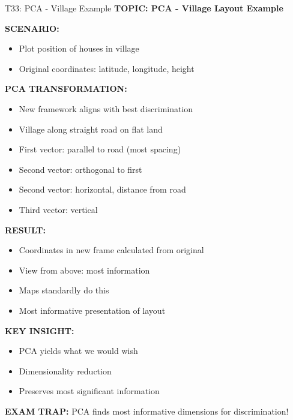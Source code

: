 \documentclass[8pt]{beamer}
\begin{document}
	\begin{frame}{T33: PCA - Village Example}
		\fontsize{6.5}{7.5}\selectfont
		\textbf{TOPIC: PCA - Village Layout Example}
		
		\vspace{0.1cm}
		\textbf{SCENARIO:}
		\begin{itemize}
			\item Plot position of houses in village
			\item Original coordinates: latitude, longitude, height
		\end{itemize}
		
		\vspace{0.1cm}
		\textbf{PCA TRANSFORMATION:}
		\begin{itemize}
			\item New framework aligns with best discrimination
			\item Village along straight road on flat land
			\item First vector: parallel to road (most spacing)
			\item Second vector: orthogonal to first
			\item Second vector: horizontal, distance from road
			\item Third vector: vertical
		\end{itemize}
		
		\vspace{0.1cm}
		\textbf{RESULT:}
		\begin{itemize}
			\item Coordinates in new frame calculated from original
			\item View from above: most information
			\item Maps standardly do this
			\item Most informative presentation of layout
		\end{itemize}
		
		\vspace{0.1cm}
		\textbf{KEY INSIGHT:}
		\begin{itemize}
			\item PCA yields what we would wish
			\item Dimensionality reduction
			\item Preserves most significant information
		\end{itemize}
		
		\textcolor{myred}{\textbf{EXAM TRAP:}} PCA finds \textcolor{myblue}{most informative dimensions} for discrimination!
	\end{frame}
	
\end{document}
